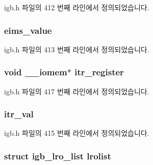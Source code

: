igb.\+h 파일의 412 번째 라인에서 정의되었습니다.

\subsubsection[{\texorpdfstring{eims\+\_\+value}{eims_value}}]{ eims\+\_\+value}\hypertarget{structigb__q__vector_a49e09972bdb0c5771225bae8a7d21c53}{}\label{structigb__q__vector_a49e09972bdb0c5771225bae8a7d21c53}


igb.\+h 파일의 413 번째 라인에서 정의되었습니다.

\subsubsection[{\texorpdfstring{itr\+\_\+register}{itr_register}}]{\setlength{\rightskip}{0pt plus 5cm}void \+\_\+\+\_\+iomem$\ast$ itr\+\_\+register}\hypertarget{structigb__q__vector_a565de9cb041839ac468e909f96eda26b}{}\label{structigb__q__vector_a565de9cb041839ac468e909f96eda26b}


igb.\+h 파일의 417 번째 라인에서 정의되었습니다.

\subsubsection[{\texorpdfstring{itr\+\_\+val}{itr_val}}]{ itr\+\_\+val}\hypertarget{structigb__q__vector_a5c824c03246700ef6b4af1978dd2e604}{}\label{structigb__q__vector_a5c824c03246700ef6b4af1978dd2e604}


igb.\+h 파일의 415 번째 라인에서 정의되었습니다.

\subsubsection[{\texorpdfstring{lrolist}{lrolist}}]{\setlength{\rightskip}{0pt plus 5cm}struct {\bf igb\+\_\+lro\+\_\+list} lrolist}\hypertarget{structigb__q__vector_a4b2f61a0e7855fe81e5423f51eee5d93}{}\label{structigb__q__vector_a4b2f61a0e7855fe81e5423f51eee5d93}


